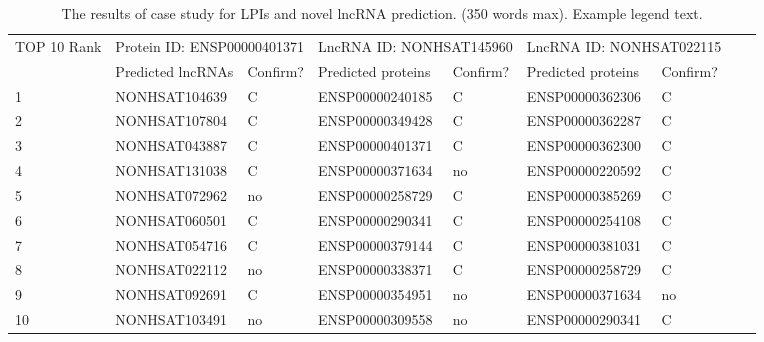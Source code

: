 \documentclass[fleqn,10pt]{wlscirep}
\begin{document}
\begin{table}[ht]
\centering
\caption{\label{tab:caseStudy1} The results of case study for LPIs and novel lncRNA prediction. (350 words max). Example legend text.}
\begin{tabular}{|l|l|l|l|l|l|l|l|l|}
\hline
\multirow{2}{*}{TOP 10 Rank} & \multicolumn{2}{|l|}{Protein ID: ENSP00000401371} & \multicolumn{2}{|l|}{LncRNA ID: NONHSAT145960}& \multicolumn{2}{|l|}{LncRNA ID: NONHSAT022115}\\
\cline{2-7}
 & Predicted lncRNAs & Confirm? & Predicted proteins & Confirm? & Predicted proteins & Confirm? \\
\hline
1 & NONHSAT104639  & C & ENSP00000240185 & C & ENSP00000362306 & C
\\
2 & NONHSAT107804 & C & ENSP00000349428	& C & ENSP00000362287 & 	C
\\
3 & NONHSAT043887  & C & ENSP00000401371	& C & ENSP00000362300 & 	C
\\
4 & NONHSAT131038  & C & ENSP00000371634	& no & ENSP00000220592  & C
\\
5 & NONHSAT072962  & no & ENSP00000258729 & C & ENSP00000385269  & C
\\
6 & NONHSAT060501  & C & ENSP00000290341	& C & ENSP00000254108  & C
\\
7 & NONHSAT054716 & C & ENSP00000379144 & C & ENSP00000381031 & C
\\
8 & NONHSAT022112 & no & ENSP00000338371 & C & ENSP00000258729 & C
\\
9 & NONHSAT092691 & C & ENSP00000354951	& no & ENSP00000371634 & no
\\
10 & NONHSAT103491 & no & ENSP00000309558 & no & ENSP00000290341  & C
\\
\hline
\end{tabular}
\end{table}
\end{document}
